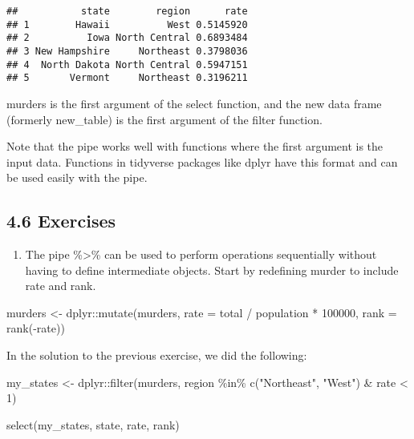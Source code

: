 \documentclass[
]{article}
\newenvironment{Shaded}{\begin{snugshade}}{\end{snugshade}}
\newcommand{\AttributeTok}[1]{\textcolor[rgb]{0.77,0.63,0.00}{#1}}
\newcommand{\DecValTok}[1]{\textcolor[rgb]{0.00,0.00,0.81}{#1}}
\newcommand{\FunctionTok}[1]{\textcolor[rgb]{0.00,0.00,0.00}{#1}}
\newcommand{\NormalTok}[1]{#1}
\newcommand{\OtherTok}[1]{\textcolor[rgb]{0.56,0.35,0.01}{#1}}
\newcommand{\SpecialCharTok}[1]{\textcolor[rgb]{0.00,0.00,0.00}{#1}}
\newcommand{\StringTok}[1]{\textcolor[rgb]{0.31,0.60,0.02}{#1}}
\providecommand{\tightlist}{%
  \setlength{\itemsep}{0pt}\setlength{\parskip}{0pt}}
\begin{document}
\begin{verbatim}
##           state        region      rate
## 1        Hawaii          West 0.5145920
## 2          Iowa North Central 0.6893484
## 3 New Hampshire     Northeast 0.3798036
## 4  North Dakota North Central 0.5947151
## 5       Vermont     Northeast 0.3196211
\end{verbatim}

murders is the first argument of the select function, and the new data
frame (formerly new\_table) is the first argument of the filter
function.

Note that the pipe works well with functions where the first argument is
the input data. Functions in tidyverse packages like dplyr have this
format and can be used easily with the pipe.

\hypertarget{exercises-1}{%
\subsection{4.6 Exercises}\label{exercises-1}}

\begin{enumerate}
\def\labelenumi{\arabic{enumi}.}
\tightlist
\item
  The pipe \%\textgreater\% can be used to perform operations
  sequentially without having to define intermediate objects. Start by
  redefining murder to include rate and rank.
\end{enumerate}

\begin{Shaded}
\begin{Highlighting}[]
\NormalTok{murders }\OtherTok{\textless{}{-}}\NormalTok{ dplyr}\SpecialCharTok{::}\FunctionTok{mutate}\NormalTok{(murders, }\AttributeTok{rate =}\NormalTok{  total }\SpecialCharTok{/}\NormalTok{ population }\SpecialCharTok{*} \DecValTok{100000}\NormalTok{, }
                  \AttributeTok{rank =} \FunctionTok{rank}\NormalTok{(}\SpecialCharTok{{-}}\NormalTok{rate))}
\end{Highlighting}
\end{Shaded}

In the solution to the previous exercise, we did the following:

\begin{Shaded}
\begin{Highlighting}[]
\NormalTok{my\_states }\OtherTok{\textless{}{-}}\NormalTok{ dplyr}\SpecialCharTok{::}\FunctionTok{filter}\NormalTok{(murders, region }\SpecialCharTok{\%in\%} \FunctionTok{c}\NormalTok{(}\StringTok{"Northeast"}\NormalTok{, }\StringTok{"West"}\NormalTok{) }\SpecialCharTok{\&} 
\NormalTok{                      rate }\SpecialCharTok{\textless{}} \DecValTok{1}\NormalTok{)}

\FunctionTok{select}\NormalTok{(my\_states, state, rate, rank)}
\end{Highlighting}
\end{Shaded}
\end{document}
